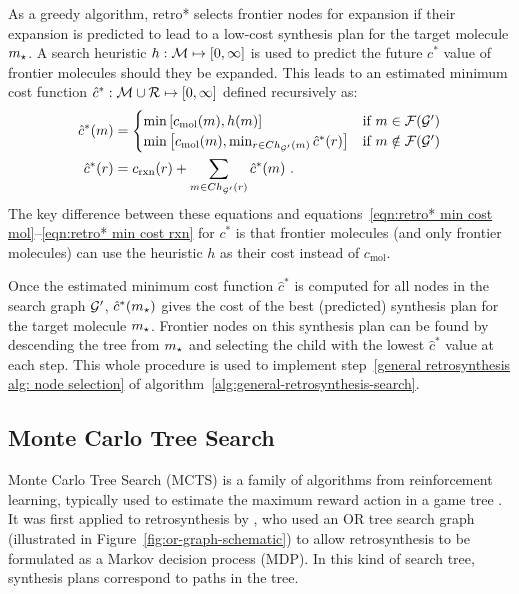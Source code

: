 As a greedy algorithm,
retro* selects frontier nodes for expansion if their expansion is
predicted to lead to a low-cost synthesis plan
for the target molecule $m_\star$.
A search heuristic $h:\mathcal{M}\mapsto[0,\infty]$
is used to predict the future $c^*$ value of frontier molecules should they be expanded.
This leads to an estimated minimum cost function 
$\hat c^*:\mathcal{M}\cup\mathcal{R}\mapsto[0,\infty]$ defined recursively as:
\begin{align}
    \hat c^*(m) &= \begin{cases}
        \min\left[ c_{\text{mol}}(m), h(m)\right] & \text{if } m\in\frontier(\gG') \\
        \min\left[
            c_{\text{mol}}(m), 
            \min_{r\in \children_{\gG'}(m)} \hat c^*(r)
        \right] & \text{if } m\notin\frontier(\gG')
    \end{cases} \label{eqn:retro* min cost mol with heuristic}\\
    \hat c^*(r) &= c_{\text{rxn}}(r) + \sum_{m\in\children_{\gG'}(r)} \hat c^*(m) \ .%
    \label{eqn:retro* min cost rxn with heuristic}
\end{align}
The key difference between these equations and
equations~\ref{eqn:retro* min cost mol}--\ref{eqn:retro* min cost rxn} for $c^*$
is that frontier molecules (and only frontier molecules) can use
the heuristic $h$ as their cost instead of $c_{\text{mol}}$.

Once the estimated minimum cost function $\hat c^*$ is computed for all nodes in the search graph ${\mathcal{G}}'$,
$\hat c^*(m_\star)$ gives the cost of the best (predicted) synthesis plan for the target molecule $m_\star$.
Frontier nodes on this synthesis plan can be found by descending the tree from $m_\star$
and selecting the child with the lowest $\hat c^*$ value at each step.
This whole procedure is used to implement step~\ref{general retrosynthesis alg: node selection}
of algorithm~\ref{alg:general-retrosynthesis-search}.

\subsection{Monte Carlo Tree Search}

Monte Carlo Tree Search (MCTS) is a family of algorithms from reinforcement learning,
typically used to estimate the maximum reward action in a game tree
\citep{browne2012survey}.
It was first applied to retrosynthesis by \citet{segler2018planning},
who used an OR tree search graph (illustrated in Figure~\ref{fig:or-graph-schematic})
to allow retrosynthesis to be formulated as a Markov decision process (MDP).
In this kind of search tree, synthesis plans correspond to paths in the tree.

